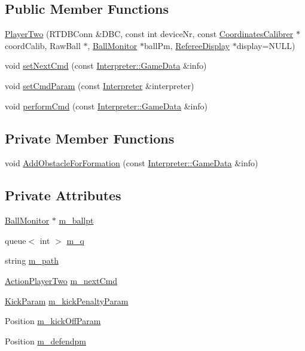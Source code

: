 \subsection*{Public Member Functions}
\begin{DoxyCompactItemize}
\item 
\hyperlink{classPlayerTwo_ac69719e70c78f7dffa36300f833955b1}{PlayerTwo} (RTDBConn \&DBC, const int deviceNr, const \hyperlink{classCoordinatesCalibrer}{CoordinatesCalibrer} $\ast$coordCalib, RawBall $\ast$, \hyperlink{classBallMonitor}{BallMonitor} $\ast$ballPm, \hyperlink{classRefereeDisplay}{RefereeDisplay} $\ast$display=NULL)
\item 
void \hyperlink{classPlayerTwo_a7ac9a9a4f1dedee2006e6a0c79f37c0c}{setNextCmd} (const \hyperlink{structInterpreter_1_1GameData}{Interpreter::GameData} \&info)
\item 
void \hyperlink{classPlayerTwo_aa0294cf24297f66ffd92f1a250794340}{setCmdParam} (const \hyperlink{classInterpreter}{Interpreter} \&interpreter)
\item 
void \hyperlink{classPlayerTwo_a56d794b718c60092a324f312b8333eb9}{performCmd} (const \hyperlink{structInterpreter_1_1GameData}{Interpreter::GameData} \&info)
\end{DoxyCompactItemize}
\subsection*{Private Member Functions}
\begin{DoxyCompactItemize}
\item 
void \hyperlink{classPlayerTwo_a9e3341541658f54a2dfb0491a774b4d4}{AddObstacleForFormation} (const \hyperlink{structInterpreter_1_1GameData}{Interpreter::GameData} \&info)
\end{DoxyCompactItemize}
\subsection*{Private Attributes}
\begin{DoxyCompactItemize}
\item 
\hyperlink{classBallMonitor}{BallMonitor} $\ast$ \hyperlink{classPlayerTwo_a14f2fe35deb15d4d45208273a51ec7eb}{m\_\-ballpt}
\item 
queue$<$ int $>$ \hyperlink{classPlayerTwo_ac2f70709bd48ad9f5c2435cbff1e65b3}{m\_\-q}
\item 
string \hyperlink{classPlayerTwo_af9880885ced53351b52dcc949f6df162}{m\_\-path}
\item 
\hyperlink{classPlayerTwo_a6dd2b1afb179fe02b677dd71ec5703d2}{ActionPlayerTwo} \hyperlink{classPlayerTwo_a35bab8a32976849cd72828a1a1fe8504}{m\_\-nextCmd}
\item 
\hyperlink{structPlayerTwo_1_1KickParam}{KickParam} \hyperlink{classPlayerTwo_ac0b6376133a18b87e4fa14036a32f0ff}{m\_\-kickPenaltyParam}
\item 
Position \hyperlink{classPlayerTwo_af294f3bef80e0df881b4452c1272376a}{m\_\-kickOffParam}
\item 
Position \hyperlink{classPlayerTwo_aa6b42d687884c55d1dd30034e7952605}{m\_\-defendpm}
\end{DoxyCompactItemize}
